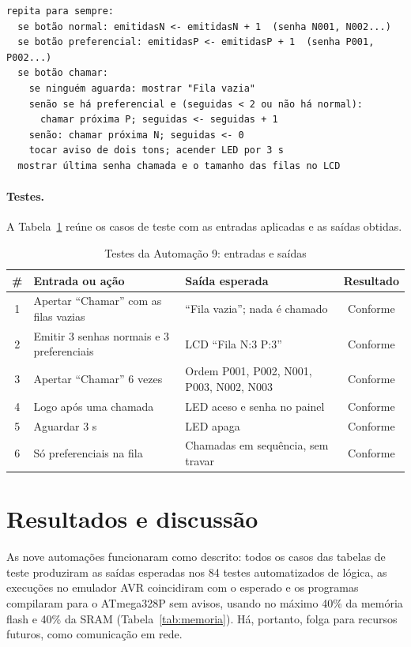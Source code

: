\documentclass[12pt]{article}
\newcommand{\conf}{Conforme}
\begin{document}
\begin{lstlisting}[style=pseudo]
repita para sempre:
  se botão normal: emitidasN <- emitidasN + 1  (senha N001, N002...)
  se botão preferencial: emitidasP <- emitidasP + 1  (senha P001, P002...)
  se botão chamar:
    se ninguém aguarda: mostrar "Fila vazia"
    senão se há preferencial e (seguidas < 2 ou não há normal):
      chamar próxima P; seguidas <- seguidas + 1
    senão: chamar próxima N; seguidas <- 0
    tocar aviso de dois tons; acender LED por 3 s
  mostrar última senha chamada e o tamanho das filas no LCD
\end{lstlisting}

\paragraph{Testes.} A Tabela~\ref{tab:teste9} reúne os casos de teste com as entradas aplicadas e as saídas obtidas.

\begin{table}[!htb]
\centering
\caption{Testes da Automação 9: entradas e saídas}\label{tab:teste9}
\small
\begin{tabularx}{\textwidth}{cXXc}
\toprule
\# & Entrada ou ação & Saída esperada & Resultado \\
\midrule
1 & Apertar ``Chamar'' com as filas vazias & ``Fila vazia''; nada é chamado & \conf \\
2 & Emitir 3 senhas normais e 3 preferenciais & LCD ``Fila N:3 P:3'' & \conf \\
3 & Apertar ``Chamar'' 6 vezes & Ordem P001, P002, N001, P003, N002, N003 & \conf \\
4 & Logo após uma chamada & LED aceso e senha no painel & \conf \\
5 & Aguardar 3 s & LED apaga & \conf \\
6 & Só preferenciais na fila & Chamadas em sequência, sem travar & \conf \\
\bottomrule
\end{tabularx}
\end{table}



\section{Resultados e discussão}\label{sec:resultados}

As nove automações funcionaram como descrito: todos os casos das tabelas de teste produziram as saídas esperadas nos 84 testes automatizados de lógica, as execuções no emulador AVR coincidiram com o esperado e os programas compilaram para o ATmega328P sem avisos, usando no máximo 40\% da memória flash e 40\% da SRAM (Tabela~\ref{tab:memoria}). Há, portanto, folga para recursos futuros, como comunicação em rede.
\end{document}
